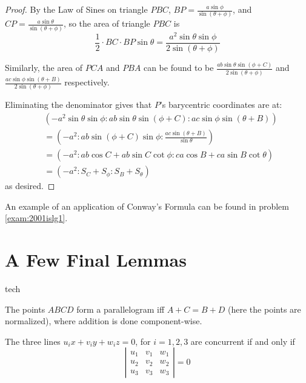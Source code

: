 \begin{proof}
  By the Law of Sines on triangle $PBC$, $BP=\frac{a\sin{\phi}}{\sin{(\theta+\phi)}}$, and $CP=\frac{a\sin{\theta}}{\sin{(\theta+\phi)}}$, so the area of triangle $PBC$ is \[ \frac{1}{2} \cdot BC \cdot BP \sin{\theta} = \frac{a^2\sin{\theta}\sin{\phi}}{2\sin{\left(\theta+\phi\right)}} \]

  Similarly, the area of $PCA$ and $PBA$ can be found to be $\frac{ab\sin{\theta}\sin{\left(\phi+C\right)}}{2\sin{(\theta+\phi)}}$ and $\frac{ac\sin{\phi}\sin{\left(\theta+B\right)}}{2\sin{(\theta+\phi)}}$ respectively.

  Eliminating the denominator gives that $P$'s barycentric coordinates are at:
  \begin{align*}
    & (-a^2\sin{\theta}\sin{\phi} : ab\sin{\theta}\sin{\left(\phi+C\right)} : ac\sin{\phi}\sin{\left(\theta+B\right)}) \\
    &=\left(-a^2 : ab\sin{\left(\phi+C\right)}{\sin{\phi}} : \frac{ac\sin{(\theta+B)}}{\sin{\theta}}\right) \\
    &=(-a^2 : ab\cos{C}+ab\sin{C}\cot{\phi} : ca\cos{B}+ca\sin{B}\cot{\theta}) \\
    &=(-a^2 : S_C+S_\phi : S_B+S_\theta)
  \end{align*}
  as desired.
\end{proof}

An example of an application of Conway's Formula can be found in problem \ref{exam:2001islg1}.

\section{A Few Final Lemmas}
\begin{StoreCode}{tech}
\begin{lemma}
  The points $ABCD$ form a parallelogram iff $A+C = B+D$ (here the points are normalized), where addition is done component-wise.
\end{lemma}
\begin{lemma}
  The three lines $u_ix+v_iy+w_iz=0$, for $i=1,2,3$ are concurrent if and only if
  \[ \left| \begin{array}{ccc} u_1 & v_1 & w_1 \\ u_2 & v_2 & w_2 \\ u_3 & v_3 & w_3 \end{array} \right| = 0\]
\end{lemma}
\end{StoreCode}
